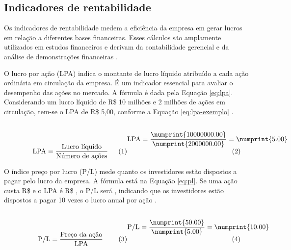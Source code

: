 \subsection{Indicadores de rentabilidade}

Os indicadores de rentabilidade medem a eficiência da empresa em gerar lucros em relação a diferentes bases financeiras. Esses cálculos são amplamente utilizados em estudos financeiros e derivam da contabilidade gerencial e da análise de demonstrações financeiras \cite{kothari:2001:capital}.

O lucro por ação (LPA) indica o montante de lucro líquido atribuído a cada ação ordinária em circulação da empresa. É um indicador essencial para avaliar o desempenho das ações no mercado.  
A fórmula é dada pela Equação \eqref{eq:lpa}. Considerando um lucro líquido de R\$ 10 milhões e 2 milhões de ações em circulação, tem-se o LPA de R\$ 5,00, conforme a Equação \eqref{eq:lpa-exemplo} \cite{omane:2019:time}.

\bigskip
\begin{subequations} \noindent
\begin{minipage}[b]{0.48\linewidth}
  \begin{equation} \label{eq:lpa}
    \text{LPA} = \frac{\text{Lucro líquido}}{\text{Número de ações}}
  \end{equation}
\end{minipage}
\hfill
\begin{minipage}[b]{0.48\linewidth}
  \begin{equation} \label{eq:lpa-exemplo}
    \text{LPA} = \frac{\numprint{10000000.00}}{\numprint{2000000.00}} = \numprint{5.00}
  \end{equation}
\end{minipage}
\end{subequations}
\bigskip

O índice preço por lucro (P/L) mede quanto os investidores estão dispostos a pagar pelo lucro da empresa.  
A fórmula está na Equação \eqref{eq:pl}. Se uma ação custa R\$  e o LPA é R\$ , o P/L será , indicando que os investidores estão dispostos a pagar 10 vezes o lucro anual por ação \cite{sahu:2023:overview}.

\bigskip
\begin{subequations} \noindent
\begin{minipage}[b]{0.48\linewidth}
    \begin{equation} \label{eq:pl}
        \text{P/L} = \frac{\text{Preço da ação}}{\text{LPA}}
    \end{equation}
\end{minipage}
\hfill
\begin{minipage}[b]{0.48\linewidth}
    \begin{equation} \label{eq:pl-exemplo}
        \text{P/L} = \frac{\numprint{50.00}}{\numprint{5.00}} = \numprint{10.00}
    \end{equation}
\end{minipage}
\end{subequations}
\bigskip

